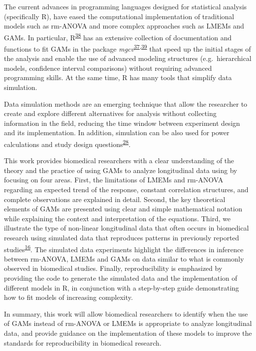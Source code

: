 \documentclass[
]{article}
\begin{document}
The current advances in programming languages designed for statistical analysis (specifically R), have eased the computational implementation of traditional models such as rm-ANOVA and more complex approaches such as LMEMs and GAMs. In particular, R\textsuperscript{\protect\hyperlink{ref-r}{38}} has an extensive collection of documentation and functions to fit GAMs in the package \emph{mgcv}\textsuperscript{\protect\hyperlink{ref-wood2017}{37},\protect\hyperlink{ref-wood2016}{39}} that speed up the initial stages of the analysis and enable the use of advanced modeling structures (e.g.~hierarchical models, confidence interval comparisons) without requiring advanced programming skills. At the same time, R has many tools that simplify data simulation.

Data simulation methods are an emerging technique that allow the researcher to create and explore different alternatives for analysis without collecting information in the field, reducing the time window between experiment design and its implementation. In addition, simulation can be also used for power calculations and study design questions\textsuperscript{\protect\hyperlink{ref-haverkamp2017}{28}}.

This work provides biomedical researchers with a clear understanding of the theory and the practice of using GAMs to analyze longitudinal data using by focusing on four areas. First, the limitations of LMEMs and rm-ANOVA regarding an expected trend of the response, constant correlation structures, and complete observations are explained in detail. Second, the key theoretical elements of GAMs are presented using clear and simple mathematical notation while explaining the context and interpretation of the equations. Third, we illustrate the type of non-linear longitudinal data that often occurs in biomedical research using simulated data that reproduces patterns in previously reported studies\textsuperscript{\protect\hyperlink{ref-vishwanath2009}{16}}. The simulated data experiments highlight the differences in inference between rm-ANOVA, LMEMs and GAMs on data similar to what is commonly observed in biomedical studies. Finally, reproducibility is emphasized by providing the code to generate the simulated data and the implementation of different models in R, in conjunction with a step-by-step guide demonstrating how to fit models of increasing complexity.

In summary, this work will allow biomedical researchers to identify when the use of GAMs instead of rm-ANOVA or LMEMs is appropriate to analyze longitudinal data, and provide guidance on the implementation of these models to improve the standards for reproducibility in biomedical research.
\end{document}
